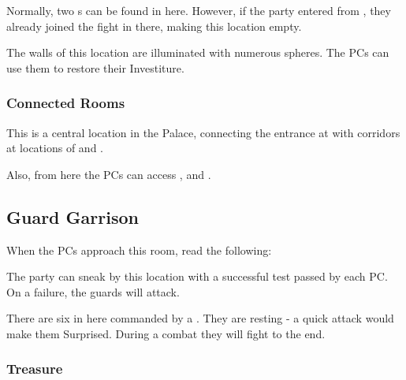 Normally, two \enemyQueensGuard{}s can be found in here. However, if the party entered from , they already joined the fight in there, making this location empty.

The walls of this location are illuminated with numerous spheres. The PCs can use them to restore their Investiture.

\subsubsection{Connected Rooms}

This is a central location in the Palace, connecting the entrance at  with corridors at locations of  and .

Also, from here the PCs can access ,  and .




\subsection{Guard Garrison}
\label{ssec:kholinarPalaceRoomsGarrison}

When the PCs approach this room, read the following:


The party can sneak by this location with a successful  test passed by each PC. On a failure, the guards will attack.

There are six \enemyQueensGuard{} in here commanded by a \enemyQueensGuardLeader{}. They are resting - a quick attack would make them Surprised. During a combat they will fight to the end.

\subsubsection{Treasure}

